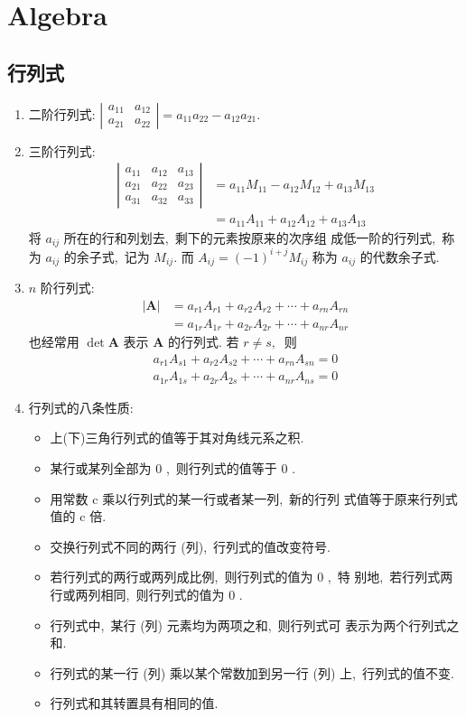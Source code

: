 	\chapter{Algebra}
	\section{行列式}
	\begin{enumerate}
		\item 二阶行列式:  $\left|\begin{array}{ll}a_{11} & a_{12} \\ a_{21} & a_{22}\end{array}\right|=a_{11} a_{22}-a_{12} a_{21} .$
		\item 三阶行列式:
		$$\begin{aligned}
			\left|\begin{array}{lll}
				a_{11} & a_{12} & a_{13} \\
				a_{21} & a_{22} & a_{23} \\
				a_{31} & a_{32} & a_{33}
			\end{array}\right| &=a_{11} M_{11}-a_{12} M_{12}+a_{13} M_{13} \\
			&=a_{11} A_{11}+a_{12} A_{12}+a_{13} A_{13}
		\end{aligned}$$
		将  $a_{i j}$  所在的行和列划去,\  剩下的元素按原来的次序组 成低一阶的行列式,\  称为  $a_{i j}$  的余子式,\  记为  $M_{i j} .$ 而  $A_{i j}=(-1)^{i+j} M_{i j}$  称为  $a_{i j}$  的代数余子式.
		\item  $n$  阶行列式:
		$$\begin{aligned}
			|\boldsymbol{A}| &=a_{r 1} A_{r 1}+a_{r 2} A_{r 2}+\cdots+a_{r n} A_{r n} \\
			&=a_{1 r} A_{1 r}+a_{2 r} A_{2 r}+\cdots+a_{n r} A_{n r}
		\end{aligned}$$
		也经常用  $\operatorname{det} \boldsymbol{A} $ 表示 $ \boldsymbol{A}$  的行列式.
		若 $ r \neq s ,\ $ 则
		$$\begin{array}{l}
			a_{r 1} A_{s 1}+a_{r 2} A_{s 2}+\cdots+a_{r n} A_{s n}=0 \\
			a_{1 r} A_{1 s}+a_{2 r} A_{2 s}+\cdots+a_{n r} A_{n s}=0
		\end{array}$$
		\item 行列式的八条性质:
		\begin{itemize}
			\item 上(下)三角行列式的值等于其对角线元系之积.
			\item 某行或某列全部为 0 ,\  则行列式的值等于 0 .
			\item 用常数  c  乘以行列式的某一行或者某一列,\  新的行列 式值等于原来行列式值的  c  倍.
			\item 交换行列式不同的两行 (列),\  行列式的值改变符号.
			\item 若行列式的两行或两列成比例,\  则行列式的值为 0 ,\  特 别地,\  若行列式两行或两列相同,\  则行列式的值为 0 .
			\item 行列式中,\  某行 (列) 元素均为两项之和,\  则行列式可 表示为两个行列式之和.
			\item  行列式的某一行 (列) 乘以某个常数加到另一行 (列) 上,\  行列式的值不变.
			\item 行列式和其转置具有相同的值.
		\end{itemize}
		

\end{enumerate}
